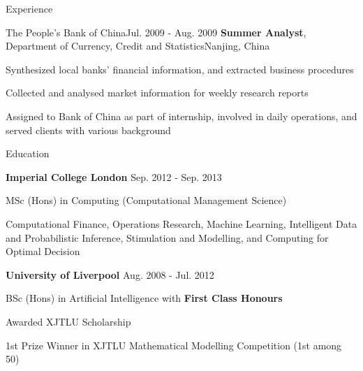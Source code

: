 \documentclass{resume} %
\begin{document}
\begin{rSection}{Experience}
        \begin{rSubsection}{The People's Bank of China}{Jul. 2009 - Aug. 2009}
        {\textbf{Summer Analyst}, Department of Currency, Credit and Statistics}{Nanjing, China}
            \item Synthesized local banks' financial information, and extracted business procedures
            \item Collected and analysed market information for weekly research reports
            \item Assigned to Bank of China as part of internship, involved in daily operations,
            and served clients with various background
        \end{rSubsection}

    \end{rSection}


    \begin{rSection}{Education}
        \begin{rSubsection}{\textbf{Imperial College London}} {Sep. 2012 - Sep. 2013}{}{}
            \item MSc (Hons) in Computing (Computational Management Science)
            \item Computational Finance, Operations Research, Machine Learning, Intelligent Data and Probabilistic Inference,
            Stimulation and Modelling, and Computing for Optimal Decision
        \end{rSubsection}

        \begin{rSubsection}{\textbf{University of Liverpool}} {Aug. 2008 - Jul. 2012}{}{}
            \item BSc (Hons) in Artificial Intelligence with \textbf{First Class Honours}
            \item Awarded XJTLU Scholarship
            \item 1st Prize Winner in XJTLU Mathematical Modelling Competition (1st among 50)
        \end{rSubsection}
    \end{rSection}
\end{document}
